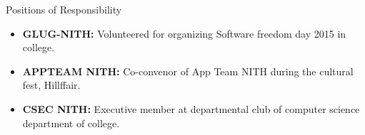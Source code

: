\documentclass[]{mcdowellcv}
\begin{document}
	\begin{cvsection}{Positions of Responsibility}
		\begin{cvsubsection}{}{}{}	
			\begin{itemize}
				\item \textbf{GLUG-NITH:} Volunteered for organizing Software freedom day 2015 in college.
				\item \textbf{APPTEAM NITH:} Co-convenor of App Team NITH during the cultural fest, Hillffair.
				\item \textbf{CSEC NITH:} Executive member at departmental club of computer science department of college.
			\end{itemize}
		\end{cvsubsection}
	\end{cvsection}
	
\end{document}
